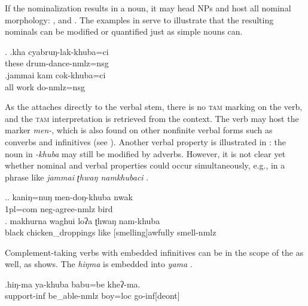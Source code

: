 	
If the nominalization results in a noun, it may head NPs and host all nominal morphology: ,  and . The examples in \Next serve to illustrate that the resulting nominals can be modified or quantified just as simple nouns can. 

\ex. \ag.kha cyabruŋ-lak-khuba=ci\\
	these drum-dance{\sc -nmlz=nsg}	\\
	 
 	\bg.jammai kam cok-khuba=ci\\
	all work do{\sc -nmlz=nsg}\\
	 	

	
As the  attaches directly to the verbal stem, there is no \textsc{tam} marking on the verb, and the \textsc{tam} interpretation is retrieved from the context. The verb may host the  marker \emph{men-}, which is also found on other nonfinite verbal forms such as converbs and infinitives (see \Next[a]). Another verbal property is illustrated in \Next: the noun in \emph{-khuba} may still be modified by adverbs. However, it is not clear yet whether nominal and verbal properties could occur simultaneously, e.g., in a phrase like \emph{jammai ʈhwaŋ namkhubaci} .
	
\ex.\ag. kaniŋ=nuŋ   men-doŋ-khuba     nwak\\
	{\sc 1pl=com} {\sc neg}-agree-{\sc nmlz} bird		\\ 
	 
\bg. makhurna waghui loʔa ʈhwaŋ nam-khuba\\
black chicken\_droppings like {[smelling]}awfully smell-{\sc nmlz}\\


Complement-taking verbs with embedded infinitives can be in the scope of the  as well, as \Next shows. The  \emph{hiŋma}  is embedded into \emph{yama} .
	
	\exg.hiŋ-ma   ya-khuba babu=be    kheʔ-ma.\\
	support{\sc -inf} be\_able{\sc -nmlz} boy{\sc =loc} go{\sc -inf[deont]}\\
	

